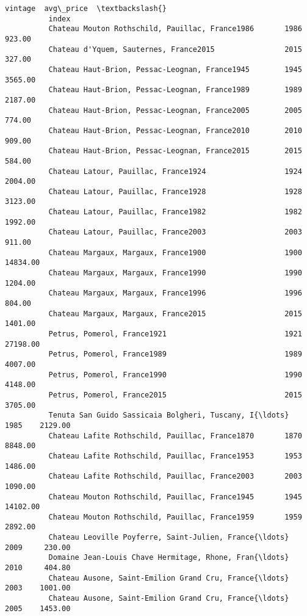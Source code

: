 \documentclass[11pt]{article}
\begin{document}
\begin{Verbatim}[commandchars=\\\{\}]
                                                             vintage  avg\_price  \textbackslash{}
          index                                                                   
          Chateau Mouton Rothschild, Pauillac, France1986       1986     923.00   
          Chateau d'Yquem, Sauternes, France2015                2015     327.00   
          Chateau Haut-Brion, Pessac-Leognan, France1945        1945    3565.00   
          Chateau Haut-Brion, Pessac-Leognan, France1989        1989    2187.00   
          Chateau Haut-Brion, Pessac-Leognan, France2005        2005     774.00   
          Chateau Haut-Brion, Pessac-Leognan, France2010        2010     909.00   
          Chateau Haut-Brion, Pessac-Leognan, France2015        2015     584.00   
          Chateau Latour, Pauillac, France1924                  1924    2004.00   
          Chateau Latour, Pauillac, France1928                  1928    3123.00   
          Chateau Latour, Pauillac, France1982                  1982    1992.00   
          Chateau Latour, Pauillac, France2003                  2003     911.00   
          Chateau Margaux, Margaux, France1900                  1900   14834.00   
          Chateau Margaux, Margaux, France1990                  1990    1204.00   
          Chateau Margaux, Margaux, France1996                  1996     804.00   
          Chateau Margaux, Margaux, France2015                  2015    1401.00   
          Petrus, Pomerol, France1921                           1921   27198.00   
          Petrus, Pomerol, France1989                           1989    4007.00   
          Petrus, Pomerol, France1990                           1990    4148.00   
          Petrus, Pomerol, France2015                           2015    3705.00   
          Tenuta San Guido Sassicaia Bolgheri, Tuscany, I{\ldots}    1985    2129.00   
          Chateau Lafite Rothschild, Pauillac, France1870       1870    8848.00   
          Chateau Lafite Rothschild, Pauillac, France1953       1953    1486.00   
          Chateau Lafite Rothschild, Pauillac, France2003       2003    1090.00   
          Chateau Mouton Rothschild, Pauillac, France1945       1945   14102.00   
          Chateau Mouton Rothschild, Pauillac, France1959       1959    2892.00   
          Chateau Leoville Poyferre, Saint-Julien, France{\ldots}    2009     230.00   
          Domaine Jean-Louis Chave Hermitage, Rhone, Fran{\ldots}    2010     404.80   
          Chateau Ausone, Saint-Emilion Grand Cru, France{\ldots}    2003    1001.00   
          Chateau Ausone, Saint-Emilion Grand Cru, France{\ldots}    2005    1453.00   

\end{Verbatim}
\end{document}
